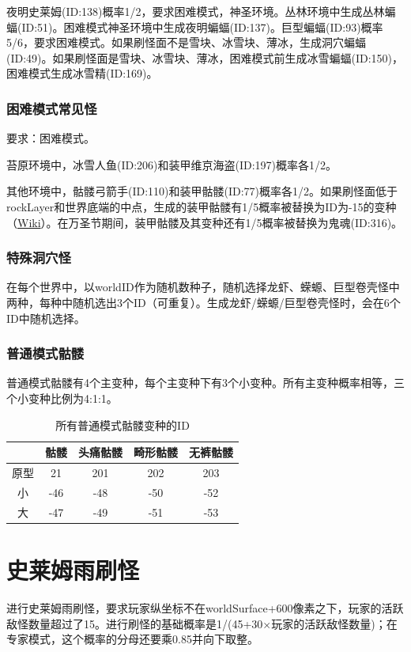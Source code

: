 夜明史莱姆(ID:138)概率1/2，要求困难模式，神圣环境。丛林环境中生成丛林蝙蝠(ID:51)。困难模式神圣环境中生成夜明蝙蝠(ID:137)。巨型蝙蝠(ID:93)概率5/6，要求困难模式。如果刷怪面不是雪块、冰雪块、薄冰，生成洞穴蝙蝠(ID:49)。如果刷怪面是雪块、冰雪块、薄冰，困难模式前生成冰雪蝙蝠(ID:150)，困难模式生成冰雪精(ID:169)。

\subsubsection{困难模式常见怪}\label{app19}
要求：困难模式。

苔原环境中，冰雪人鱼(ID:206)和装甲维京海盗(ID:197)概率各1/2。

其他环境中，骷髅弓箭手(ID:110)和装甲骷髅(ID:77)概率各1/2。如果刷怪面低于rockLayer和世界底端的中点，生成的装甲骷髅有1/5概率被替换为ID为-15的变种（\href{https://terraria-zh.gamepedia.com/装甲骷髅}{Wiki}）。在万圣节期间，装甲骷髅及其变种还有1/5概率被替换为鬼魂(ID:316)。

\subsubsection{特殊洞穴怪}\label{app20}
在每个世界中，以worldID作为随机数种子，随机选择龙虾、蝾螈、巨型卷壳怪中两种，每种中随机选出3个ID（可重复）。生成龙虾/蝾螈/巨型卷壳怪时，会在6个ID中随机选择。

\subsubsection{普通模式骷髅}\label{app21}
普通模式骷髅有4个主变种，每个主变种下有3个小变种。所有主变种概率相等，三个小变种比例为4:1:1。
\begin{table}[!h]
    \centering
    \begin{tabular}{c|cccc}
         &骷髅&头痛骷髅&畸形骷髅&无裤骷髅\\\hline
         原型&21 &201&202&203\\
         小  &-46&-48&-50&-52\\
         大  &-47&-49&-51&-53
    \end{tabular}
    \caption{所有普通模式骷髅变种的ID}
\end{table}

\section{史莱姆雨刷怪}
进行史莱姆雨刷怪，要求玩家纵坐标不在worldSurface+600像素之下，玩家的活跃敌怪数量超过了15。进行刷怪的基础概率是1/(45+30$\times$玩家的活跃敌怪数量)；在专家模式，这个概率的分母还要乘0.85并向下取整。

